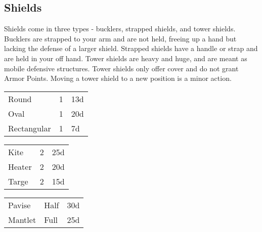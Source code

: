\subsection{Shields}

Shields come in three types - bucklers, strapped shields, and
tower shields. Bucklers are strapped to your arm and are not
held, freeing up a hand but lacking the defense of a larger
shield. Strapped shields have a handle or strap and are held
in your off hand. Tower shields are heavy and huge, and are
meant as mobile defensive structures. Tower shields only offer
cover and do not grant Armor Points. Moving a tower shield to
a new position is a minor action.

\begin{center}
{
\begin{xtabular}{|l|l|l|}
Round & 1 & 13d \\
Oval & 1 & 20d \\
Rectangular & 1 & 7d \\
\hline
\end{xtabular}
}
\end{center}

\begin{center}
{
\begin{xtabular}{|l|l|l|}
Kite & 2 & 25d \\
Heater & 2 & 20d \\
Targe & 2 & 15d \\
\hline
\end{xtabular}
}
\end{center}

\begin{center}
{
\begin{xtabular}{|l|l|l|}
Pavise & Half & 30d \\
Mantlet & Full & 25d \\
\hline
\end{xtabular}
}
\end{center}


